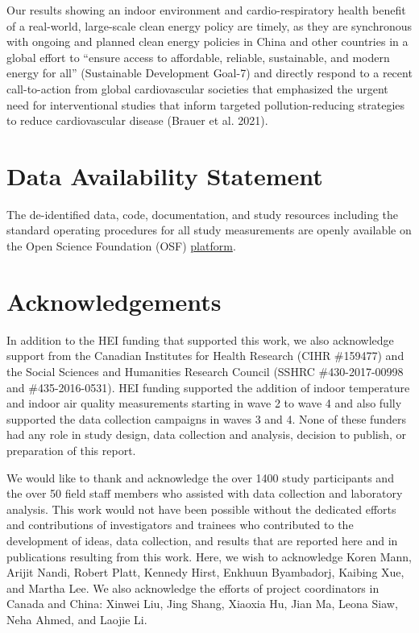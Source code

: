 \documentclass[
  letterpaper,
  DIV=11,
  numbers=noendperiod]{scrartcl}
\begin{document}
Our results showing an indoor environment and cardio-respiratory health
benefit of a real-world, large-scale clean energy policy are timely, as
they are synchronous with ongoing and planned clean energy policies in
China and other countries in a global effort to ``ensure access to
affordable, reliable, sustainable, and modern energy for all''
(Sustainable Development Goal-7) and directly respond to a recent
call-to-action from global cardiovascular societies that emphasized the
urgent need for interventional studies that inform targeted
pollution-reducing strategies to reduce cardiovascular disease (Brauer
et al. 2021).

\section{Data Availability Statement}\label{data-availability-statement}

The de-identified data, code, documentation, and study resources
including the standard operating procedures for all study measurements
are openly available on the Open Science Foundation (OSF)
\href{https://osf.io/8twds/?view_only=c41dd3d6228240d6aad92f81371c5339}{platform}.

\section{Acknowledgements}\label{acknowledgements}

In addition to the HEI funding that supported this work, we also
acknowledge support from the Canadian Institutes for Health Research
(CIHR \#159477) and the Social Sciences and Humanities Research Council
(SSHRC \#430-2017-00998 and \#435-2016-0531). HEI funding
supported the addition of indoor temperature and indoor
air quality measurements starting in wave 2 to wave 4 and also fully
supported the data collection campaigns in waves 3 and 4. None of these
funders had any role in study design, data collection and analysis,
decision to publish, or preparation of this report.

We would like to thank and acknowledge the over 1400 study participants
and the over 50 field staff members who assisted with data collection
and laboratory analysis. This work would not have been possible without
the dedicated efforts and contributions of investigators and trainees
who contributed to the development of ideas, data collection, and
results that are reported here and in publications resulting from this
work. Here, we wish to acknowledge Koren Mann, Arijit Nandi, Robert
Platt, Kennedy Hirst, Enkhuun Byambadorj, Kaibing Xue, and Martha Lee.
We also acknowledge the efforts of project coordinators in Canada and
China: Xinwei Liu, Jing Shang, Xiaoxia Hu, Jian Ma, Leona Siaw, Neha
Ahmed, and Laojie Li.
\end{document}
